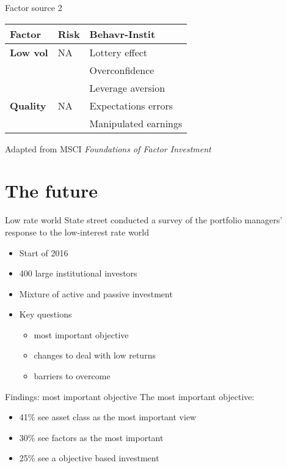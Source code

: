 \documentclass[14pt,xcolor=pdftex,dvipsnames,table]{beamer}\usepackage[]{graphicx}\usepackage[]{color}
\begin{document}
\begin{frame}{Factor source 2}
\begin{table}
\begin{center}
\begin{tabular}{l p{3cm} l}
\textbf{Factor} & \textbf{Risk} & \textbf{Behavr-Instit}\\
\hline
\textbf{Low vol} & NA          & Lottery effect\\
        &             & Overconfidence\\
        &             & Leverage aversion\\
\textbf{Quality} & NA          & Expectations errors\\
        &             & Manipulated earnings\\
\end{tabular}
\end{center}
\end{table}
Adapted from MSCI \emph{Foundations of Factor Investment}

\end{frame}



\section{The future}
\begin{frame}{Low rate world}
State street conducted a survey of the portfolio managers' response to the low-interest rate world
\begin{itemize}[<+-| alert@+>]
\pause
\item Start of 2016
\item 400 large institutional investors
\item Mixture of active and passive investment
\item Key questions 
\begin{itemize}
\item most important objective
\item changes to deal with low returns
\item barriers to overcome
\end{itemize}
\end{itemize}
\end{frame}

\begin{frame}{Findings: most important objective}
The most important objective:
\begin{itemize}[<+-| alert@+>]
\pause
\item 41\% see asset class as the most important view
\item 30\% see factors as the most important
\item 25\% see a objective based investment
\end{itemize}
\end{frame}
\end{document}
